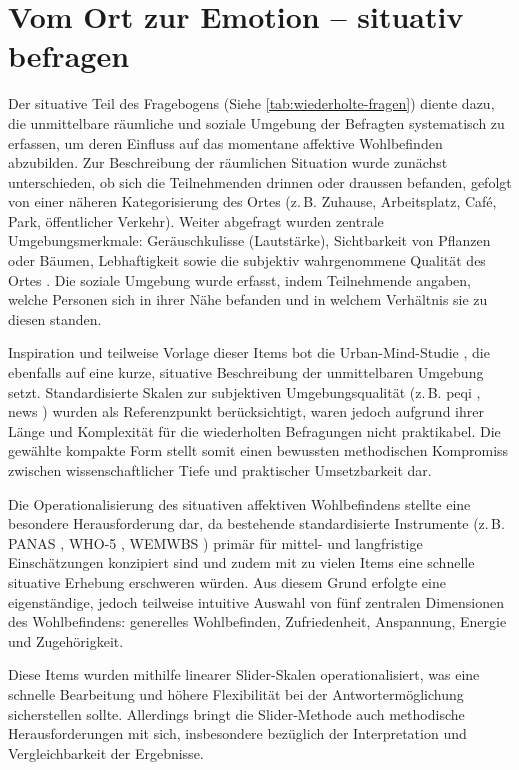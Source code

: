 \section{Vom Ort zur Emotion -- situativ befragen}

Der situative Teil des Fragebogens (Siehe \cref{tab:wiederholte-fragen}) diente dazu, die unmittelbare räumliche und soziale Umgebung der Befragten systematisch zu erfassen, um deren Einfluss auf das momentane affektive Wohlbefinden abzubilden. Zur Beschreibung der räumlichen Situation wurde zunächst unterschieden, ob sich die Teilnehmenden drinnen oder draussen befanden, gefolgt von einer näheren Kategorisierung des Ortes (z.\,B. Zuhause, Arbeitsplatz, Café, Park, öffentlicher Verkehr). Weiter abgefragt wurden zentrale Umgebungsmerkmale: Geräuschkulisse (Lautstärke), Sichtbarkeit von Pflanzen oder Bäumen, Lebhaftigkeit sowie die subjektiv wahrgenommene Qualität des Ortes . Die soziale Umgebung wurde erfasst, indem Teilnehmende angaben, welche Personen sich in ihrer Nähe befanden und in welchem Verhältnis sie zu diesen standen.

Inspiration und teilweise Vorlage dieser Items bot die Urban-Mind-Studie \parencite{bakolisUrbanMindUsing2018}, die ebenfalls auf eine kurze, situative Beschreibung der unmittelbaren Umgebung setzt. Standardisierte Skalen zur subjektiven Umgebungsqualität (z.\,B. \acrfull{peqi} \parencite{bonaiutoPerceivedResidentialEnvironment2015}, \acrfull{news} \parencite{saelensNeighborhoodEnvironmentWalkability2018}) wurden als Referenzpunkt berücksichtigt, waren jedoch aufgrund ihrer Länge und Komplexität für die wiederholten Befragungen nicht praktikabel. Die gewählte kompakte Form stellt somit einen bewussten methodischen Kompromiss zwischen wissenschaftlicher Tiefe und praktischer Umsetzbarkeit dar.

Die Operationalisierung des situativen affektiven Wohlbefindens stellte eine besondere Herausforderung dar, da bestehende standardisierte Instrumente (z.\,B. PANAS \parencite{yountMeasuringMoodComparison2023}, WHO-5 \parencite{toppWHO5WellBeingIndex2015}, WEMWBS \parencite{tennantWarwickEdinburghMentalWellbeing2007}) primär für mittel- und langfristige Einschätzungen konzipiert sind und zudem mit zu vielen Items eine schnelle situative Erhebung erschweren würden. Aus diesem Grund erfolgte eine eigenständige, jedoch teilweise intuitive Auswahl von fünf zentralen Dimensionen des Wohlbefindens: generelles Wohlbefinden, Zufriedenheit, Anspannung, Energie und Zugehörigkeit.

Diese Items wurden mithilfe linearer Slider-Skalen operationalisiert, was eine schnelle Bearbeitung und höhere Flexibilität bei der Antwortermöglichung sicherstellen sollte. Allerdings bringt die Slider-Methode auch methodische Herausforderungen mit sich, insbesondere bezüglich der Interpretation und Vergleichbarkeit der Ergebnisse.

